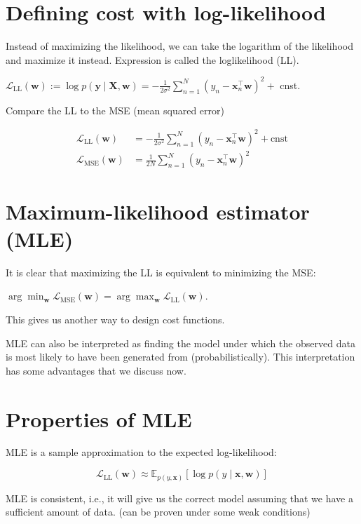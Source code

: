\documentclass[10pt]{article}
\begin{document}
\section*{Defining cost with log-likelihood}
Instead of maximizing the likelihood, we can take the logarithm of the likelihood and maximize it instead. Expression is called the loglikelihood (LL).

$\mathcal{L}_{\mathrm{LL}}(\mathbf{w}):=\log p(\mathbf{y} \mid \mathbf{X}, \mathbf{w})=-\frac{1}{2 \sigma^{2}} \sum_{n=1}^{N}\left(y_{n}-\mathbf{x}_{n}^{\top} \mathbf{w}\right)^{2}+$ cnst.

Compare the LL to the MSE (mean squared error)

$$
\begin{aligned}
\mathcal{L}_{\mathrm{LL}}(\mathbf{w}) & =-\frac{1}{2 \sigma^{2}} \sum_{n=1}^{N}\left(y_{n}-\mathbf{x}_{n}^{\top} \mathbf{w}\right)^{2}+\mathrm{cnst} \\
\mathcal{L}_{\mathrm{MSE}}(\mathbf{w}) & =\frac{1}{2 N} \sum_{n=1}^{N}\left(y_{n}-\mathbf{x}_{n}^{\top} \mathbf{w}\right)^{2}
\end{aligned}
$$

\section*{Maximum-likelihood estimator (MLE)}
It is clear that maximizing the LL is equivalent to minimizing the MSE:

$\arg \min _{\mathbf{w}} \mathcal{L}_{\mathrm{MSE}}(\mathbf{w})=\arg \max _{\mathbf{w}} \mathcal{L}_{\mathrm{LL}}(\mathbf{w})$.

This gives us another way to design cost functions.

MLE can also be interpreted as finding the model under which the observed data is most likely to have been generated from (probabilistically). This interpretation has some advantages that we discuss now.

\section*{Properties of MLE}
MLE is a sample approximation to the expected log-likelihood:

$$
\mathcal{L}_{\mathrm{LL}}(\mathbf{w}) \approx \mathbb{E}_{p(y, \mathbf{x})}[\log p(y \mid \mathbf{x}, \mathbf{w})]
$$

MLE is consistent, i.e., it will give us the correct model assuming that we have a sufficient amount of data. (can be proven under some weak conditions)
\end{document}
